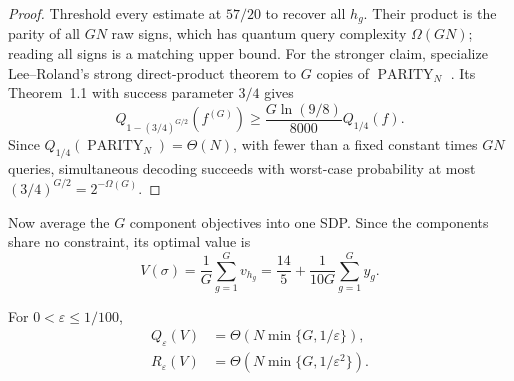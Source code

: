 \begin{proof}
Threshold every estimate at $57/20$ to recover all $h_g$.  Their product is
the parity of all $GN$ raw signs, which has quantum query complexity
$\Omega(GN)$; reading all signs is a matching upper bound.  For the stronger
claim, specialize Lee--Roland's strong direct-product theorem to
$G$ copies of $\operatorname{PARITY}_N$
\cite{lee2012-a-strong-direct-product-theorem}.  Its Theorem~1.1 with
success parameter $3/4$ gives
\[
 Q_{1-(3/4)^{G/2}}(f^{(G)})
 \ge\frac{G\ln(9/8)}{8000}Q_{1/4}(f).
\]
Since $Q_{1/4}(\operatorname{PARITY}_N)=\Theta(N)$, with fewer than a
fixed constant times $GN$ queries, simultaneous decoding succeeds with
worst-case probability at most $(3/4)^{G/2}=2^{-\Omega(G)}$.
\end{proof}

Now average the $G$ component objectives into one SDP.  Since the components
share no constraint, its optimal value is
\begin{equation}
 V(\sigma)=\frac1G\sum_{g=1}^Gv_{h_g}
 =\frac{14}{5}+\frac1{10G}\sum_{g=1}^Gy_g.
 \label{eq:sc-batch-value}
\end{equation}

\begin{theorem}
\label{thm:sc-batch-scalar}
For $0<\varepsilon\le1/100$,
\begin{align}
 Q_\varepsilon(V)&=\Theta\!\left(
 N\min\{G,1/\varepsilon\}\right),
 \label{eq:sc-batch-quantum}\\
 R_\varepsilon(V)&=\Theta\!\left(
 N\min\{G,1/\varepsilon^2\}\right).
 \label{eq:sc-batch-classical}
\end{align}
\end{theorem}

